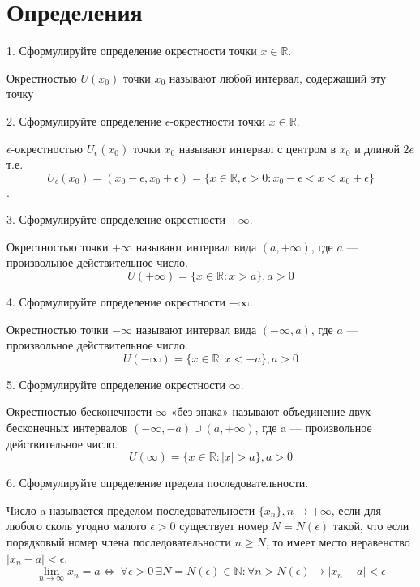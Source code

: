\documentclass[a4paper, 10pt]{article}
\begin{document}
\section{Определения}
    \begin{bf}1. Сформулируйте определение окрестности точки $x \in \mathbb{R}$.\end{bf}

    Окрестностью $U(x_0)$ точки $x_0$ называют любой интервал, содержащий эту точку

    \begin{bf}2. Сформулируйте определение $\epsilon$-окрестности точки $x \in \mathbb{R}$. \end{bf}

    $\epsilon$-окрестностью $U_\epsilon(x_0)$ точки $x_0$ называют интервал с центром в 
    $x_0$ и длиной $2\epsilon$ т.е. $$U_\epsilon(x_0) = (x_0 - \epsilon, x_0 + \epsilon) = 
    \{x \in \mathbb{R},  \epsilon>0 : x_0 - \epsilon < x < x_0 + \epsilon\}$$.

    \begin{bf}3. Сформулируйте определение окрестности $+\infty$. \end{bf}

    Окрестностью точки $+\infty$ называют интервал вида $(a, +\infty)$, где $a$ — произвольное действительное число.
    $$U(+\infty) = \{x \in \mathbb{R}: x > a\}, a > 0$$

    \begin{bf}4. Сформулируйте определение окрестности $-\infty$. \end{bf}

    Окрестностью точки $-\infty$ называют интервал вида $(-\infty, a)$, где $a$ — произвольное действительное число.
    $$U(-\infty) = \{x \in \mathbb{R}: x < -a\}, a > 0$$

    \begin{bf}5. Сформулируйте определение окрестности $\infty$. \end{bf}

    Окрестностью бесконечности $\infty$ «без знака»  называют объединение двух бесконечных интервалов 
    $(-\infty, -a) \cup (a, +\infty)$, где a — произвольное действительное число.
    $$U(\infty) = \{x \in \mathbb{R}: |x| > a\}, a > 0$$

    \begin{bf}6. Сформулируйте определение предела последовательности.\end{bf}
    
    Число a называется пределом последовательности $\{x_n\}, n \to +\infty$, если для любого 
    сколь угодно малого $\epsilon > 0$ существует номер $N = N(\epsilon)$ такой, что 
    если порядковый номер члена последовательности $n  \geqslant  N$, то имеет место неравенство 
    $|x_n - a| < \epsilon$. 
    $$\lim\limits_{n \to \infty} x_n = a \iff \ \forall \epsilon > 0 \  \exists N = N(\epsilon) \in 
    \mathbb{N} : \forall n > N(\epsilon) \longrightarrow |x_n - a| < \epsilon$$
    
\end{document}
